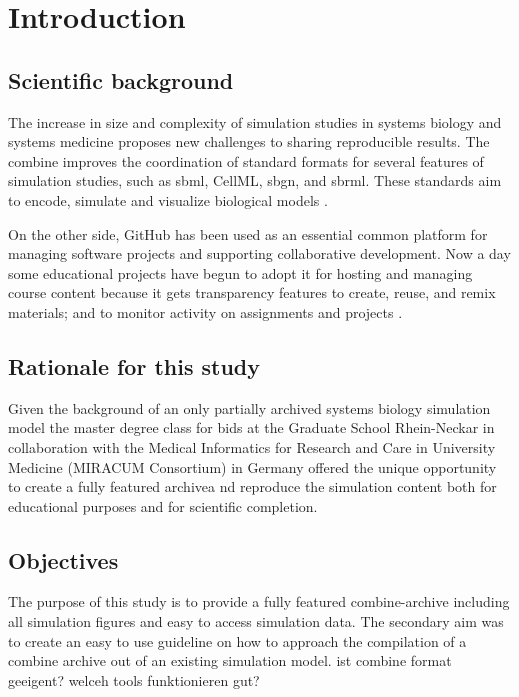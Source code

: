 \section*{Introduction}


\subsection*{Scientific background}
The increase in size and complexity of simulation studies in systems biology and systems medicine proposes new challenges to sharing reproducible results. The \ac{combine} improves the coordination of standard formats for several features of simulation studies, such as \ac{sbml}, CellML, \ac{sbgn}, and \ac{sbrml}. These standards aim to encode, simulate and visualize biological models \cite{combine}.

On the other side, GitHub has been used as an essential common platform for managing software projects and supporting collaborative development. Now a day some educational projects have begun to adopt it for hosting and managing course content because it gets transparency features to create, reuse, and remix materials; and to monitor activity on assignments and projects \cite{github}.


\subsection*{Rationale for this study}
Given the background of an only partially archived  systems biology simulation model the master degree class for \ac{bids} at the Graduate School Rhein-Neckar  in  collaboration  with  the  Medical  Informatics  for  Research  and  Care  in  University Medicine (MIRACUM Consortium) in Germany offered the unique opportunity to create a fully featured archivea nd reproduce the simulation content both for educational purposes and for scientific completion. 

\subsection*{Objectives}
The purpose of this study is to provide a fully featured \acs{combine}-archive including all simulation figures and easy to access simulation data. The secondary aim was to create an easy to use guideline on how to approach the compilation of a \acs{combine} archive out of an existing simulation model. ist combine format geeigent? welceh tools funktionieren gut?

